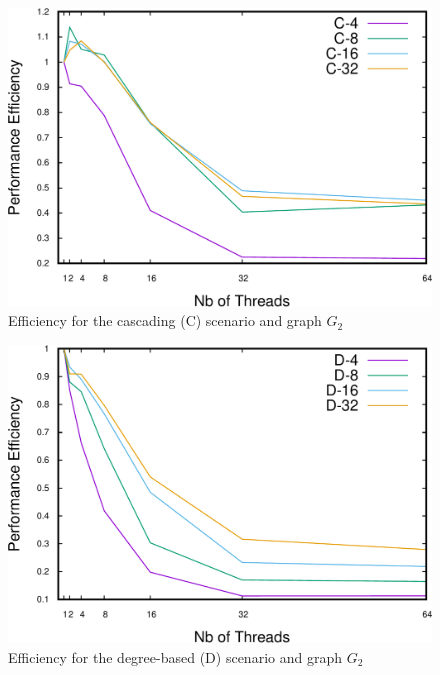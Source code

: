 \begin{figure}
\centering
\includegraphics[scale=0.35]{bench/bench-efficiency/efficiency-c-2-crop.pdf}
\caption{Efficiency for the cascading (C) scenario and graph $G_2$}
\label{fig:effc2}
\end{figure}

\begin{figure}
\centering
\includegraphics[scale=0.35]{bench/bench-efficiency/efficiency-d-2-crop.pdf}
\caption{Efficiency for the degree-based (D) scenario and graph $G_2$}
\label{fig:effd2}
\end{figure}


